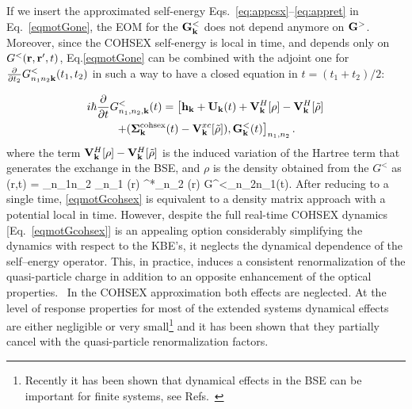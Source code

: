 If we insert the approximated self-energy Eqs.~\eqref{eq:appcsx}--\eqref{eq:appret} in Eq.~\eqref{eqmotGone}, the EOM for the ${\bf G}_{{\bf k}}^<$  does not depend anymore on ${\bf G}^>$.
Moreover, since the COHSEX self-energy is local in time, and depends only on $G^<({\bf r},{\bf r}',t)$, Eq.\eqref{eqmotGone} can be combined with the adjoint one for $\frac{\partial}{\partial t_2} G^<_{n_1n_2{\bf k}}(t_1,t_2)$ in such a way to have a closed equation in $t=(t_1+t_2)/2$:

\begin{multline}
\label{eqmotGcohsex}
 i\hbar  \frac{\partial}{\partial t} G_{n_1,n_2,{\bf k}}^<(t)=
 \left [ {\bf h}_{{\bf k}} + {\bf U}_{{\bf k}}(t) +  {\bf V}_{{\bf k}}^H[\rho] -
   {\bf V}_{{\bf k}}^H[\tilde \rho] \right .\\
   \left . + ({\bf \Sigma}_{{\bf k}}^{\mathrm{cohsex}} (t)
   -{\bf V}_{{\bf k}}^{xc}[\tilde \rho]), {\bf G}_{{\bf k}}^<(t)\right ]_{n_1,n_2}.
\end{multline}
where the term ${\bf V}_{{\bf k}}^H[\rho] - {\bf V}_{{\bf k}}^H[\tilde \rho]$ is the induced variation of the Hartree term that generates the exchange in the BSE, and $\rho$ is the density obtained from the $G^<$ as 
\be
\label{eqden}
\rho(\mathbf r,t) =  \sum_{n_1n_2\kk} \varphi_{n_1 \kk} (\mathbf r)  \varphi^*_{n_2 \kk}  (\mathbf r) G^<_{n_2n_1\kk}(t).
\ee
After reducing to a single time, \eqref{eqmotGcohsex} is equivalent to a density matrix approach with a potential local in time. 
%
However, despite the full real-time COHSEX dynamics [Eq.~\ref{eqmotGcohsex}] is an appealing
option considerably simplifying the dynamics with respect to the KBE's,
it neglects the dynamical dependence of the self--energy operator. This, in practice, induces a consistent renormalization 
of the quasi-particle charge\cite{PhysRevLett.45.290} in addition to an opposite enhancement of the optical properties.~\cite{PhysRevLett.91.176402}
In the COHSEX approximation both effects are neglected.
At the level of response properties for
most of the extended systems dynamical effects are either negligible or very small\footnote{
Recently it has been shown that dynamical effects in the BSE can be important for finite
systems, see Refs.~\cite{bsedynamic,PhysRevB.77.115118}} and it has been shown that they  
partially cancel with the  quasi-particle renormalization factors.~\cite{PhysRevLett.91.176402} 

